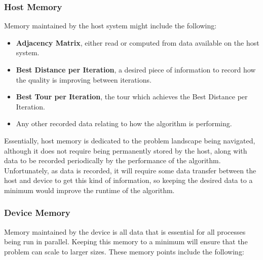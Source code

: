 \documentclass[11pt]{report}
\begin{document}
            \subsubsection{Host Memory}
            Memory maintained by the host system might include the following:
            
            \begin{itemize}
                \item \textbf{Adjacency Matrix}, either read or computed from data available on the host system.
                \item \textbf{Best Distance per Iteration}, a desired piece of information to record how the quality is improving between iterations.
                \item \textbf{Best Tour per Iteration}, the tour which achieves the Best Distance per Iteration.
                \item Any other recorded data relating to how the algorithm is performing.
            \end{itemize}
            
            Essentially, host memory is dedicated to the problem landscape being navigated, although it does not require being permanently stored by the host, along with data to be recorded periodically by the performance of the algorithm. Unfortunately, as data is recorded, it will require some data transfer between the host and device to get this kind of information, so keeping the desired data to a minimum would improve the runtime of the algorithm.
            
            \subsubsection{Device Memory}
            Memory maintained by the device is all data that is essential for all processes being run in parallel. Keeping this memory to a minimum will ensure that the problem can scale to larger sizes. These memory points include the following:
            
\end{document}
